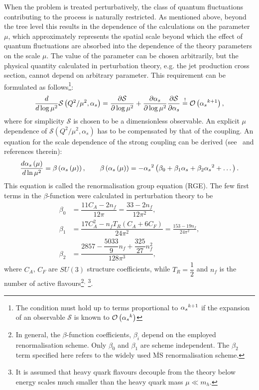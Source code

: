 When the problem is treated perturbatively, the class of quantum fluctuations contributing to the process is naturally restricted. As mentioned above, beyond the tree level this results in the dependence of the calculations on the parameter $\mu$, which approximately represents the spatial scale beyond which the effect of quantum fluctuations are absorbed into the dependence of the theory parameters on the scale $\mu$. The value of the parameter can be chosen arbitrarily, but the physical quantity calculated in perturbation theory, e.g. the jet production cross section, cannot depend on arbitrary parameter. This requirement can be formulated as follows\footnote{The condition must hold up to terms proportional to $\mbox{$\alpha_{s}$}^{k+1}$ if the expansion of an observable $\mathcal{S}$ is known to $\mathcal{O}\left(\mbox{$\alpha_{s}$}^{k}\right)$}:
\begin{equation}
 \frac{d}{d\log{\mu^2}} \mathcal{S} \left( Q^2/\mu^2, \alpha_s \right) = \frac{\partial \mathcal{S} }{\partial \log{\mu^2}} + \frac{\partial \alpha_s }{\partial \log{\mu^2}}\frac{\partial \mathcal{S} }{\partial \alpha_s} \stackrel{!}{=} \mathcal{O}\left(\mbox{$\alpha_{s}$}^{k+1}\right),
\end{equation}
where for simplicity $\mathcal{S}$ is chosen to be a dimensionless observable. An explicit $\mu$ dependence of $\mathcal{S} \left( Q^2/\mu^2, \alpha_s \right)$ has to be compensated by that of the coupling. An equation for the scale dependence of the strong coupling can be derived (see~\cite{QCDrge:2014} and references therein):
 \begin{equation}
   \frac{d\mbox{$\alpha_{s}$}\left(\mu\right)}{d\ln{\mu^2}} = \beta\left(\mbox{$\alpha_{s}$}\left(\mu\right)\right),\qquad \beta\left(\mbox{$\alpha_{s}$}\left(\mu\right)\right) = -\mbox{$\alpha_{s}$}^2\left(\beta_0 + \beta_1\mbox{$\alpha_{s}$} + \beta_2\mbox{$\alpha_{s}$}^2 + \dots \right).
 \label{eq:asrunnig}
 \end{equation}
This equation is called the renormalisation group equation (RGE). The few first terms in the $\beta$-function were calculated in perturbation theory to be
\begin{align}
	\beta_0 &= \dfrac{11C_A-2n_f}{12\pi} = \dfrac{33 - 2n_f}{12\pi^2},\\
	\beta_1 &= \dfrac{17C_A^2-n_fT_R\left(C_A+6C_F\right)}{24\pi^2} = \frac{153-19n_f}{24\pi^2},\\
	\beta_2 &= \dfrac{2857-\dfrac{5033}{9}n_f+\dfrac{325}{27}n_f^2}{128\pi^3},
\end{align}
where $C_A$, $C_F$ are $SU\left(3\right)$ structure coefficients, while $T_R=\dfrac{1}{2}$ and $n_f$ is the number of active flavours\footnote{In general, the $\beta$-function coefficients, $\beta_i$ depend on the employed renormalisation scheme. Only $\beta_0$ and $\beta_1$ are scheme independent. The $\beta_2$ term specified here refers to the widely used $\overline{\mathrm{MS}}$ renormalisation scheme.}$^,$
\footnote{It is assumed that heavy quark flavours decouple from the theory below energy scales much smaller than the heavy quark mass $\mu \ll m_h$.}. 

